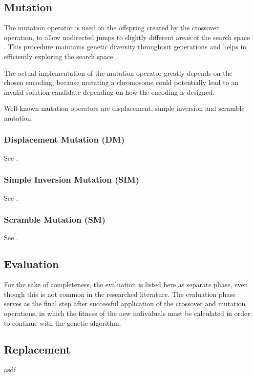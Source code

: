 \documentclass[sigconf]{acmart}
\begin{document}
\subsection{Mutation}
The mutation operator is used on the offspring created by the crossover
operation, to allow undirected jumps to slightly different areas of the search
space \cite{Affenzeller2009}. This procedure maintains genetic diversity
throughout generations and helps in efficiently exploring the search space
\cite{Katoch2021, Affenzeller2009}.

The actual implementation of the mutation operator greatly depends on the chosen
encoding, because mutating a chromosome could potentially lead to an invalid
solution candidate depending on how the encoding is designed.

Well-known mutation operators are displacement, simple inversion and scramble
mutation.

\subsubsection{Displacement Mutation (DM)}
See \cite{Katoch2021}.

\subsubsection{Simple Inversion Mutation (SIM)}
See \cite{Katoch2021}.

\subsubsection{Scramble Mutation (SM)}
See \cite{Katoch2021}.

\subsection{Evaluation}
For the sake of completeness, the evaluation is listed here as separate phase,
even though this is not common in the researched literature. The evaluation
phase serves as the final step after successful application of the crossover
and mutation operations, in which the fitness of the new individuals
must be calculated in order to continue with the genetic algorithm.

\subsection{Replacement}
asdf
\end{document}
